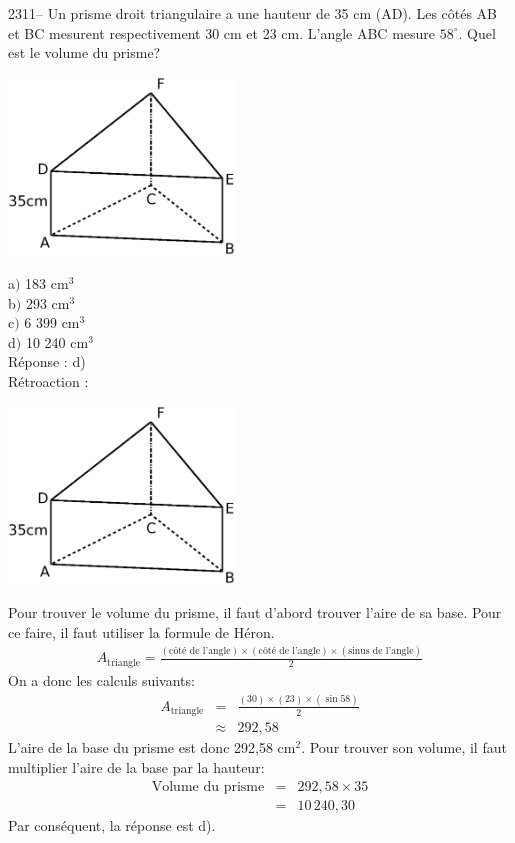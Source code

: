 \documentclass[letterpaper, 12pt]{article}
\begin{document}
2311-- Un prisme droit triangulaire a une hauteur de 35 cm (AD). Les c\^ot\'es AB et BC mesurent respectivement 30 cm et 23 cm. L'angle ABC mesure $58^{\circ}$. Quel est le volume du prisme?\\
\begin{center}
 \includegraphics[width=6cm,bb=14 14 507 391]{Q2311.eps}
\end{center}

a$)$ 183 cm$^{3}$\\
b$)$ 293 cm$^{3}$\\
c$)$ 6 399 cm$^{3}$\\
d$)$ 10 240 cm$^{3}$\\

R\'eponse : d)\\

R\'etroaction :\\
\begin{center}
 \includegraphics[width=6cm,bb=14 14 507 391]{Q2311.eps}
\end{center}
Pour trouver le volume du prisme, il faut d'abord trouver l'aire de sa base. Pour ce faire, il faut utiliser la formule de H\'eron.
\begin{eqnarray*}
A_{\textrm{triangle}}=\frac{(\textrm{c\^ot\'e de l'angle})\times(\textrm{c\^ot\'e de l'angle})\times(\textrm{sinus de l'angle})}{2}
\end{eqnarray*}
On a donc les calculs suivants:
 \begin{eqnarray*}
A_{\textrm{triangle}}&=&\frac{(30)\times(23)\times(\sin{58})}{2}\\
&\approx&292,58
\end{eqnarray*}
L'aire de la base du prisme est donc 292,58 cm$^{2}$. Pour trouver son volume, il faut multiplier l'aire de la base par la hauteur:
 \begin{eqnarray*}
\textrm{Volume du prisme}&=&292,58\times35\\
&=&10\,240,30
\end{eqnarray*}
Par cons\'equent, la r\'eponse est d).\\
\end{document}
